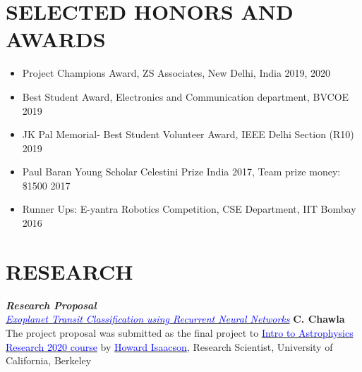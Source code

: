 \documentclass[11pt]{res} %
\newcommand{\titlegap}{5pt} %
\newcommand{\sectgap}{0.05in} %
\begin{document}
\begin{resume}
\vspace{0.1in}
\hline
\section{SELECTED HONORS AND AWARDS}

\vspace{0.2in} 

\begin{itemize}
    \item Project Champions Award, ZS Associates, New Delhi, India \hfill 2019, 2020
    \item Best Student Award, Electronics and Communication department, BVCOE \hfill 2019
    \item{}JK Pal Memorial- Best Student Volunteer Award, IEEE Delhi Section (R10) \hfill 2019
    \item Paul Baran Young Scholar Celestini Prize India 2017, Team prize money: \$1500 \hfill 2017
    \item Runner Ups: E-yantra Robotics Competition, CSE Department, IIT Bombay \hfill 2016
\end{itemize}

\vspace{\sectgap} 

\hline



\section{\large RESEARCH}

\vspace{\titlegap}

\textbf{\textit{Research Proposal}}\\
\textit{\href{https://drive.google.com/file/d/1Dy6xjWMH5EVmVreHnUj9QBFsuitt-dDZ/view?usp=sharing}{\textcolor{blue}{Exoplanet Transit Classification using Recurrent Neural Networks}}}  \hfill \textbf{C. Chawla} \\
The project proposal was submitted as the final project to \href{https://github.com/howardisaacson/Intro-to-Astro-2020}{\textcolor{blue}{Intro to Astrophysics Research 2020 course}} by \href{https://hisaacson2.wixsite.com/website}{\textcolor{blue}{Howard Isaacson}}, Research Scientist, University of California, Berkeley



\end{resume}
\end{document}
